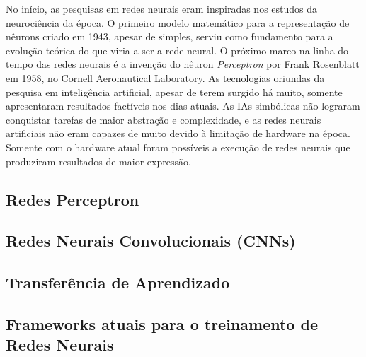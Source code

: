 \documentclass[12pt, a4paper]{article}
\begin{document}
No início, as pesquisas em redes neurais eram inspiradas nos estudos da neurociência da época. O primeiro modelo matemático para a representação de nêurons \cite{mcculloch_pitts} criado em 1943, apesar de simples, serviu como fundamento para a evolução teórica do que viria a ser a rede neural. O próximo marco na linha do tempo das redes neurais é a invenção do nêuron \emph{Perceptron} por Frank Rosenblatt em 1958, no Cornell Aeronautical Laboratory. As tecnologias oriundas da pesquisa em inteligência artificial, apesar de terem surgido há muito, somente apresentaram resultados factíveis nos dias atuais. As IAs simbólicas não lograram conquistar tarefas de maior abstração e complexidade, e as redes neurais artificiais não eram capazes de muito devido à limitação de hardware na época. Somente com o hardware atual foram possíveis a execução de redes neurais que produziram resultados de maior expressão.

\subsection{Redes Perceptron}
\subsection{Redes Neurais Convolucionais (CNNs)}
\subsection{Transferência de Aprendizado}
\subsection{Frameworks atuais para o treinamento de Redes Neurais}

\printbibliography
\end{document}
